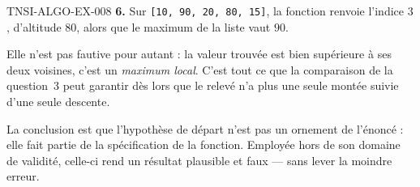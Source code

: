 \begin{corrige}{TNSI-ALGO-EX-008}
\textbf{6.} Sur \lstinline{[10, 90, 20, 80, 15]}, la fonction renvoie l'indice
$3$, d'altitude $80$, alors que le maximum de la liste vaut $90$.

Elle n'est pas fautive pour autant : la valeur trouvée est bien supérieure à ses
deux voisines, c'est un \emph{maximum local}. C'est tout ce que la comparaison de
la question~3 peut garantir dès lors que le relevé n'a plus une seule montée
suivie d'une seule descente.

La conclusion est que l'hypothèse de départ n'est pas un ornement de l'énoncé :
elle fait partie de la spécification de la fonction. Employée hors de son domaine
de validité, celle-ci rend un résultat plausible et faux — sans lever la moindre
erreur.
\end{corrige}
